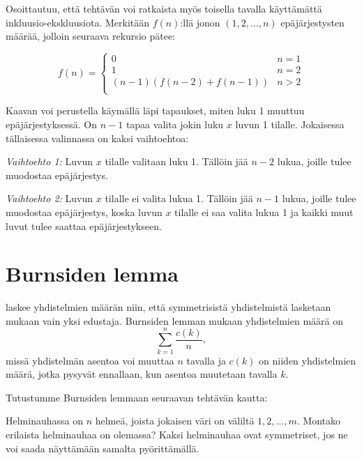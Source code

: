 Osoittautuu, että tehtävän voi ratkaista myös toisella
tavalla käyttämättä inkluusio-ekskluusiota.
Merkitään $f(n)$:llä jonon $(1,2,\ldots,n)$ epäjärjestysten määrää,
jolloin seuraava rekursio pätee:

\begin{equation*}
    f(n) = \begin{cases}
               0               & n = 1\\
               1               & n = 2\\
               (n-1)(f(n-2) + f(n-1)) & n>2 \\
           \end{cases}
\end{equation*}

Kaavan voi perustella käymällä läpi tapaukset,
miten luku 1 muuttuu epäjärjestyksessä.
On $n-1$ tapaa valita jokin luku $x$ luvun 1 tilalle.
Jokaisessa tällaisessa valinnassa on kaksi vaihtoehtoa:

\textit{Vaihtoehto 1:} Luvun $x$ tilalle valitaan luku 1.
Tällöin jää $n-2$ lukua, joille tulee muodostaa epäjärjestys.

\textit{Vaihtoehto 2:} Luvun $x$ tilalle ei valita lukua 1.
Tällöin jää $n-1$ lukua, joille tulee muodostaa epäjärjestys,
koska luvun $x$ tilalle ei saa valita lukua 1
ja kaikki muut luvut tulee saattaa epäjärjestykseen.

\section{Burnsiden lemma}


 laskee yhdistelmien määrän niin,
että symmetrisistä yhdistelmistä lasketaan
mukaan vain yksi edustaja.
Burnsiden lemman mukaan yhdistelmien määrä on
\[\sum_{k=1}^n \frac{c(k)}{n},\]
missä yhdistelmän asentoa voi muuttaa $n$ tavalla
ja $c(k)$ on niiden yhdistelmien määrä,
jotka pysyvät ennallaan, kun asentoa
muutetaan tavalla $k$.

Tutustumme Burnsiden lemmaan seuraavan tehtävän kautta:

\begin{task}
Helminauhassa on $n$ helmeä,
joista jokaisen väri on väliltä $1,2,\ldots,m$.
Montako erilaista helminauhaa on olemassa?
Kaksi helminauhaa ovat symmetriset,
jos ne voi saada näyttämään samalta pyörittämällä.
\end{task}


